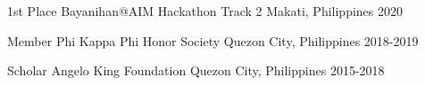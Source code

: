 
\begin{cvhonors}

  \cvhonor
    {1st Place} %
    {Bayanihan@AIM Hackathon Track 2} %
    {Makati, Philippines} %
    {2020} %

  \cvhonor
    {Member} %
    {Phi Kappa Phi Honor Society} %
    {Quezon City, Philippines} %
    {2018-2019} %

  \cvhonor
    {Scholar} %
    {Angelo King Foundation} %
    {Quezon City, Philippines} %
    {2015-2018} %

\end{cvhonors}
